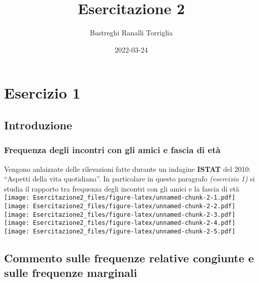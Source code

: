 \documentclass[
]{article}
\title{Esercitazione 2}
\author{Bastreghi Ranalli Torriglia}
\date{2022-03-24}
\begin{document}
\maketitle

\hypertarget{esercizio-1}{%
\section{Esercizio 1}\label{esercizio-1}}

\hypertarget{introduzione}{%
\subsection{Introduzione}\label{introduzione}}

\hypertarget{frequenza-degli-incontri-con-gli-amici-e-fascia-di-etuxe0}{%
\subsubsection{Frequenza degli incontri con gli amici e fascia di
età}\label{frequenza-degli-incontri-con-gli-amici-e-fascia-di-etuxe0}}

Vengono anlaizzate delle rilevazioni fatte durante un indagine
\textbf{ISTAT} del 2010: ``Aspetti della vita quotidiana''. In
particolare in questo paragrafo \emph{(esercizio 1)} si studia il
rapporto tra frequenza degli incontri con gli amici e la fascia di età
\texttt{[image: Esercitazione2\_files/figure-latex/unnamed-chunk-2-1.pdf]}
\texttt{[image: Esercitazione2\_files/figure-latex/unnamed-chunk-2-2.pdf]}
\texttt{[image: Esercitazione2\_files/figure-latex/unnamed-chunk-2-3.pdf]}
\texttt{[image: Esercitazione2\_files/figure-latex/unnamed-chunk-2-4.pdf]}
\texttt{[image: Esercitazione2\_files/figure-latex/unnamed-chunk-2-5.pdf]}

\hypertarget{commento-sulle-frequenze-relative-congiunte-e-sulle-frequenze-marginali}{%
\subsection{Commento sulle frequenze relative congiunte e sulle
frequenze
marginali}\label{commento-sulle-frequenze-relative-congiunte-e-sulle-frequenze-marginali}}
\end{document}
